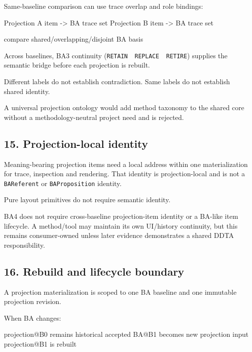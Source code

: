 \documentclass[
  11pt,
  a4paper,
]{article}
\newenvironment{Shaded}{}{}
\newcommand{\NormalTok}[1]{#1}
\begin{document}
Same-baseline comparison can use trace overlap and role bindings:

\begin{Shaded}
\begin{Highlighting}[]
\NormalTok{Projection A item {-}\textgreater{} BA trace set}
\NormalTok{Projection B item {-}\textgreater{} BA trace set}

\NormalTok{compare shared/overlapping/disjoint BA basis}
\end{Highlighting}
\end{Shaded}

Across baselines, BA3 continuity
(\texttt{RETAIN\ \textbar{}\ REPLACE\ \textbar{}\ RETIRE}) supplies the
semantic bridge before each projection is rebuilt.

Different labels do not establish contradiction. Same labels do not
establish shared identity.

A universal projection ontology would add method taxonomy to the shared
core without a methodology-neutral project need and is rejected.

\subsection{15. Projection-local
identity}\label{projection-local-identity}

Meaning-bearing projection items need a local address within one
materialization for trace, inspection and rendering. That identity is
projection-local and is not a \texttt{BAReferent} or
\texttt{BAProposition} identity.

Pure layout primitives do not require semantic identity.

BA4 does not require cross-baseline projection-item identity or a
BA-like item lifecycle. A method/tool may maintain its own UI/history
continuity, but this remains consumer-owned unless later evidence
demonstrates a shared DDTA responsibility.

\subsection{16. Rebuild and lifecycle
boundary}\label{rebuild-and-lifecycle-boundary}

A projection materialization is scoped to one BA baseline and one
immutable projection revision.

When BA changes:

\begin{Shaded}
\begin{Highlighting}[]
\NormalTok{projection@B0 remains historical}
\NormalTok{accepted BA@B1 becomes new projection input}
\NormalTok{projection@B1 is rebuilt}
\end{Highlighting}
\end{Shaded}
\end{document}
